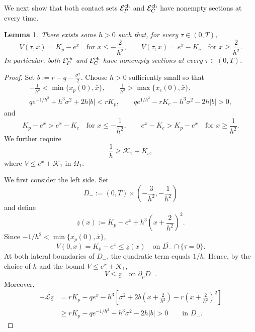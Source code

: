 \documentclass[11pt, a4paper, leqno]{amsart}
\numberwithin{equation}{section}
\theoremstyle{plain}
\newtheorem{lemma}[theorem]{Lemma}
\theoremstyle{definition}
\theoremstyle{remark}
\def\leq{\leqslant}
\def\geq{\geqslant}
\begin{document}
{
We next show that both contact sets $\mathcal{E}_P^{\rm ch}$ and $\mathcal{E}_C^{\rm ch}$ have nonempty sections at every
time.


\begin{lemma}\label{FB: contact}
There exists some $h>0$ such that, for every $\tau\in(0,T)$,
\[
    V(\tau,x)=K_p-e^x
    \quad\text{for }x\leq-\frac{2}{h^2},
    \qquad
    V(\tau,x)=e^x-K_c
    \quad\text{for }x\geq\frac{2}{h^2}.
\]
In particular, both $\mathcal E_P^{\rm ch}$ and
$\mathcal E_C^{\rm ch}$ have nonempty sections at every
$\tau\in(0,T)$.
\end{lemma}

\begin{proof}
Set $b:=r-q-\frac{\sigma^2}{2}$. Choose $h>0$ sufficiently small so
that
\[
\begin{gathered}
    -\frac1{h^2}<\min\{x_p(0),\bar x\},
    \qquad
    \frac1{h^2}>\max\{x_c(0),\bar x\},\\
    q e^{-1/h^2}+h^3\sigma^2+2h|b|<rK_p,
    \qquad
    q e^{1/h^2}-rK_c-h^3\sigma^2-2h|b|>0,
\end{gathered}
\]
and
\[
    K_p-e^x>e^x-K_c
    \quad\text{for }x\leq-\frac1{h^2},
    \qquad
    e^x-K_c>K_p-e^x
    \quad\text{for }x\geq\frac1{h^2}.
\]
We further require
\[
    \frac1h\geq\mathcal K_1+K_c,
\]
where $V\leq e^x+\mathcal K_1$ in $\Omega_T$.

We first consider the left side. Set
\[
    D_-:=(0,T)\times
    \left(-\frac3{h^2},-\frac1{h^2}\right)
\]
and define
\[
    \underline z(x)
    :=
    K_p-e^x
    +h^3\left(x+\frac2{h^2}\right)^2.
\]
Since $-1/h^2<\min\{x_p(0),\bar x\}$,
\[
    V(0,x)=K_p-e^x\leq\underline z(x)
    \quad\text{on } \overline{D_-}\cap\{\tau=0\}.
\]
At both lateral boundaries of $D_-$, the quadratic term equals
$1/h$. Hence, by the choice of $h$ and the bound
$V\leq e^x+\mathcal K_1$,
\[
    V\leq\underline z
    \quad\text{on }\partial_pD_-.
\]
Moreover,
\[
\begin{aligned}
    -\mathcal L\underline z
    &=
    rK_p-qe^x
    -h^3\left[
        \sigma^2
        +2b\left(x+\frac2{h^2}\right)
        -r\left(x+\frac2{h^2}\right)^2
    \right] \\
    &\geq
    rK_p-qe^{-1/h^2}-h^3\sigma^2-2h|b|
    >0
    \qquad\text{in }D_-.
\end{aligned}
\]


\end{proof}}
\end{document}
